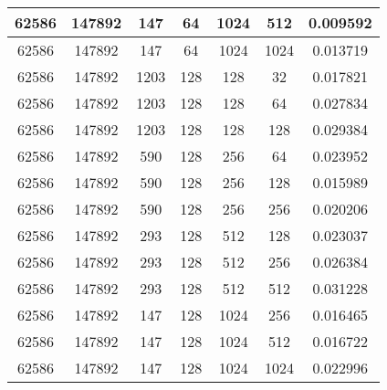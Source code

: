 \documentclass[9pt]{article}
\begin{document}
\begin{tabular}{|c|c|c|c|c|c|c| }
\hline
62586  & 147892  & 147  & 64  & 1024  & 512  & 0.009592 \\
\hline
62586  & 147892  & 147  & 64  & 1024  & 1024  & 0.013719 \\
\hline
62586  & 147892  & 1203  & 128  & 128  & 32  & 0.017821 \\
\hline
62586  & 147892  & 1203  & 128  & 128  & 64  & 0.027834 \\
\hline
62586  & 147892  & 1203  & 128  & 128  & 128  & 0.029384 \\
\hline
62586  & 147892  & 590  & 128  & 256  & 64  & 0.023952 \\
\hline
62586  & 147892  & 590  & 128  & 256  & 128  & 0.015989 \\
\hline
62586  & 147892  & 590  & 128  & 256  & 256  & 0.020206 \\
\hline
62586  & 147892  & 293  & 128  & 512  & 128  & 0.023037 \\
\hline
62586  & 147892  & 293  & 128  & 512  & 256  & 0.026384 \\
\hline
62586  & 147892  & 293  & 128  & 512  & 512  & 0.031228 \\
\hline
62586  & 147892  & 147  & 128  & 1024  & 256  & 0.016465 \\
\hline
62586  & 147892  & 147  & 128  & 1024  & 512  & 0.016722 \\
\hline
62586  & 147892  & 147  & 128  & 1024  & 1024  & 0.022996 \\
\hline
\end{tabular}
 
\end{document}
